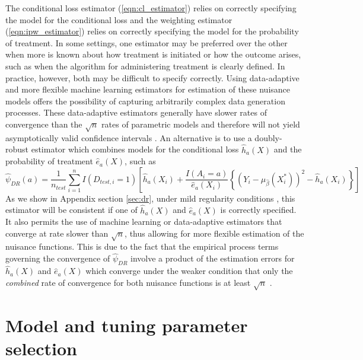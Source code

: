 The conditional loss estimator (\ref{eqn:cl_estimator}) relies on correctly specifying the model for the conditional loss and the weighting estimator (\ref{eqn:ipw_estimator})  relies on correctly specifying the model for the probability of treatment. In some settings, one estimator may be preferred over the other when more is known about how treatment is initiated or how the outcome arises, such as when the algorithm for administering treatment is clearly defined. In practice, however, both may be difficult to specify correctly. Using data-adaptive and more flexible machine learning estimators for estimation of these nuisance models offers the possibility of capturing arbitrarily complex data generation processes. These data-adaptive estimators generally have slower rates of convergence than the $\sqrt{n}$ rates of parametric models and therefore will not yield asymptotically valid confidence intervals \cite{chernozhukov_doubledebiased_2018}. An alternative is to use a doubly-robust estimator which combines models for the conditional loss $\widehat{h}_a(X)$ and the probability of treatment $\widehat{e}_a(X)$, such as
\begin{equation}
    \widehat{\psi}_{DR}(a) = \frac{1}{n_{test}} \sum_{i=1}^n I(D_{test,i} = 1) \left[ \widehat{h}_a(X_i) + \frac{I(A_i = a)}{\widehat{e}_a(X_i)} \left\{ (Y_i - \mu_{\widehat{\beta}}(X^*_i))^2 - \widehat{h}_a(X_i)\right\}\right]
\end{equation}
As we show in Appendix section \ref{sec:dr}, under mild regularity conditions \cite{robins_higher_2008}, this estimator will be consistent if one of $\widehat{h}_a(X)$ and $\widehat{e}_a(X)$ is correctly specified. It also permits the use of machine learning or data-adaptive estimators that converge at rate slower than $\sqrt{n}$, thus allowing for more flexible estimation of the nuisance functions. This is due to the fact that the empirical process terms governing the convergence of $\widehat{\psi}_{DR}$ involve a product of the estimation errors for $\widehat{h}_a(X)$ and $\widehat{e}_a(X)$ which converge under the weaker condition that only the \textit{combined} rate of convergence for both nuisance functions is at least $\sqrt{n}$ \cite{chernozhukov_doubledebiased_2018}.

\section{Model and tuning parameter selection} \label{sec:selection}

